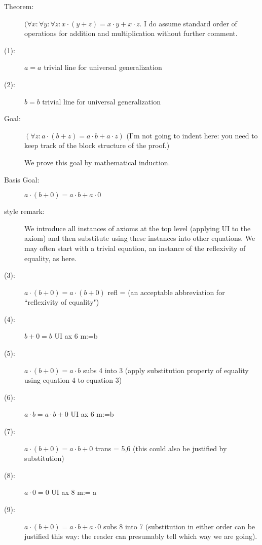 \documentclass[12pt]{book}
\begin{document}
\begin{description}

\item[Theorem: ]$(\forall x:\forall y:\forall z:x\cdot(y+z) = x \cdot y + x \cdot z$.  I do assume standard order of operations for addition and multiplication without further comment.

\item[(1):] $a=a$ trivial line for universal generalization

\item[(2):] $b=b$ trivial line for universal generalization

\item[Goal:]  $(\forall z:a\cdot(b+z) = a \cdot b + a \cdot z)$ (I'm not going to indent here:  you need to keep track of the block structure of the proof.)

We prove this goal by mathematical induction.

\item[Basis Goal:]  $a\cdot(b+0) = a \cdot b + a \cdot 0$

\item[style remark:]  We introduce all instances of axioms at the top level (applying UI to the axiom) and then substitute using these
instances into other equations.  We may often start with a trivial equation, an instance of the reflexivity of equality, as here.

\item[(3):]  $a \cdot (b+0) = a\cdot (b+0)$  refl = (an acceptable abbreviation for ``reflexivity of equality")

\item[(4):]  $b+0=b$  UI ax 6 m:=b

\item[(5):]  $a \cdot (b+0) = a \cdot b$  subs 4 into 3 (apply substitution property of equality using equation 4 to equation 3)

\item[(6):]  $a \cdot b = a \cdot b+0$  UI ax 6 m:=b

\item[(7):]    $a \cdot (b+0) =  a \cdot b+0$  trans = 5,6  (this could also be justified by substitution)

\item[(8):]  $a \cdot 0 = 0$ UI ax 8 m:= a

\item[(9):]  $a\cdot(b+0) = a \cdot b + a \cdot 0$  subs 8 into 7 (substitution in either order can be justified this way:  the reader can presumably tell which way we are going).


\end{description}
\end{document}
